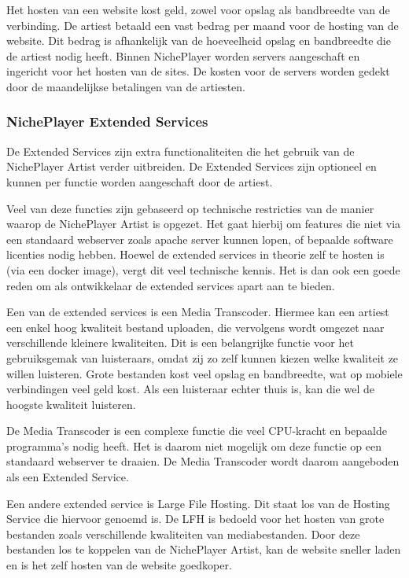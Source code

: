 Het hosten van een website kost geld, zowel voor opslag als bandbreedte van de verbinding. De artiest betaald een vast bedrag per maand voor de hosting van de website. Dit bedrag is afhankelijk van de hoeveelheid opslag en bandbreedte die de artiest nodig heeft. Binnen NichePlayer worden servers aangeschaft en ingericht voor het hosten van de sites. De kosten voor de servers worden gedekt door de maandelijkse betalingen van de artiesten.

\subsubsection*{NichePlayer Extended Services}
De Extended Services zijn extra functionaliteiten die het gebruik van de NichePlayer Artist verder uitbreiden. De Extended Services zijn optioneel en kunnen per functie worden aangeschaft door de artiest.

Veel van deze functies zijn gebaseerd op technische restricties van de manier waarop de NichePlayer Artist is opgezet. Het gaat hierbij om features die niet via een standaard webserver zoals apache server kunnen lopen, of bepaalde software licenties nodig hebben. Hoewel de extended services in theorie zelf te hosten is (via een docker image), vergt dit veel technische kennis. Het is dan ook een goede reden om als ontwikkelaar de extended services apart aan te bieden.

Een van de extended services is een Media Transcoder. Hiermee kan een artiest een enkel hoog kwaliteit bestand uploaden, die vervolgens wordt omgezet naar verschillende kleinere kwaliteiten. Dit is een belangrijke functie voor het gebruiksgemak van luisteraars, omdat zij zo zelf kunnen kiezen welke kwaliteit ze willen luisteren. Grote bestanden kost veel opslag en bandbreedte, wat op mobiele verbindingen veel geld kost. Als een luisteraar echter thuis is, kan die wel de hoogste kwaliteit luisteren.

De Media Transcoder is een complexe functie die veel CPU-kracht en bepaalde programma's  nodig heeft. Het is daarom niet mogelijk om deze functie op een standaard webserver te draaien. De Media Transcoder wordt daarom aangeboden als een Extended Service.

Een andere extended service is Large File Hosting. Dit staat los van de Hosting Service die hiervoor genoemd is. De LFH is bedoeld voor het hosten van grote bestanden zoals verschillende kwaliteiten van mediabestanden. Door deze bestanden los te koppelen van de NichePlayer Artist, kan de website sneller laden en is het zelf hosten van de website goedkoper.

